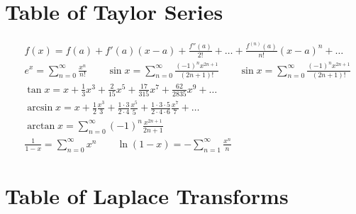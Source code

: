 \documentclass[12pt]{book}
\begin{document}
\section{Table of Taylor Series}
\begin{align*}
  & f(x) = f(a) + f'(a)(x-a) + \frac{f''(a)}{2!} + \dots
  + \frac{f^{(n)}(a)}{n!}(x-a)^n + \dots
  \\
  & e^x = \sum_{n=0}^\infty \frac{x^n}{n!}
  \qquad \sin x = \sum_{n=0}^\infty \frac{(-1)^n x^{2n+1}}{(2n+1)!}
  \qquad \sin x = \sum_{n=0}^\infty \frac{(-1)^n x^{2n+1}}{(2n+1)!}
  \\
  &\tan x = x + \frac{1}{3}x^3 + \frac{2}{15}x^5 + \frac{17}{315}x^7
  + \frac{62}{2835}x^9 + \dots
  \\
  &\arcsin x = x + \frac{1}{2}\frac{x^3}{3}
  + \frac{1\cdot 3}{2\cdot 4}\frac{x^5}{5}
  + \frac{1\cdot3\cdot5}{2\cdot4\cdot6}\frac{x^7}{7} + \dots
  \\
  &\arctan x = \sum_{n=0}^\infty (-1)^n \frac{x^{2n+1}}{2n+1}
  \\
  &\frac{1}{1-x} = \sum_{n=0}^\infty x^n
  \qquad \ln(1-x) = -\sum_{n=1}^\infty \frac{x^n}{n}
\end{align*}

\newpage
\section{Table of Laplace Transforms}
\end{document}
